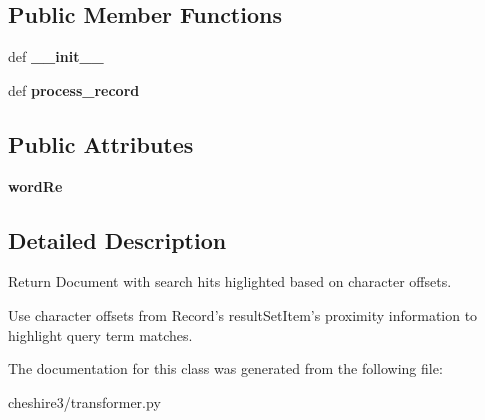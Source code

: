 \subsection*{Public Member Functions}
\begin{DoxyCompactItemize}
\item 
\hypertarget{classcheshire3_1_1transformer_1_1_lxml_offset_query_term_highlighting_transformer_a483498aa5d12ae80c629b8a9df74437e}{def {\bfseries \-\_\-\-\_\-init\-\_\-\-\_\-}}\label{classcheshire3_1_1transformer_1_1_lxml_offset_query_term_highlighting_transformer_a483498aa5d12ae80c629b8a9df74437e}

\item 
\hypertarget{classcheshire3_1_1transformer_1_1_lxml_offset_query_term_highlighting_transformer_aab020f224bb05338c380620bb3753a1c}{def {\bfseries process\-\_\-record}}\label{classcheshire3_1_1transformer_1_1_lxml_offset_query_term_highlighting_transformer_aab020f224bb05338c380620bb3753a1c}

\end{DoxyCompactItemize}
\subsection*{Public Attributes}
\begin{DoxyCompactItemize}
\item 
\hypertarget{classcheshire3_1_1transformer_1_1_lxml_offset_query_term_highlighting_transformer_a870aa6b8df8c996260da2f2c75d556ff}{{\bfseries word\-Re}}\label{classcheshire3_1_1transformer_1_1_lxml_offset_query_term_highlighting_transformer_a870aa6b8df8c996260da2f2c75d556ff}

\end{DoxyCompactItemize}


\subsection{Detailed Description}
\begin{DoxyVerb}Return Document with search hits higlighted based on character offsets.

Use character offsets from Record's resultSetItem's proximity information
to highlight query term matches.
\end{DoxyVerb}
 

The documentation for this class was generated from the following file\-:\begin{DoxyCompactItemize}
\item 
cheshire3/transformer.\-py\end{DoxyCompactItemize}
